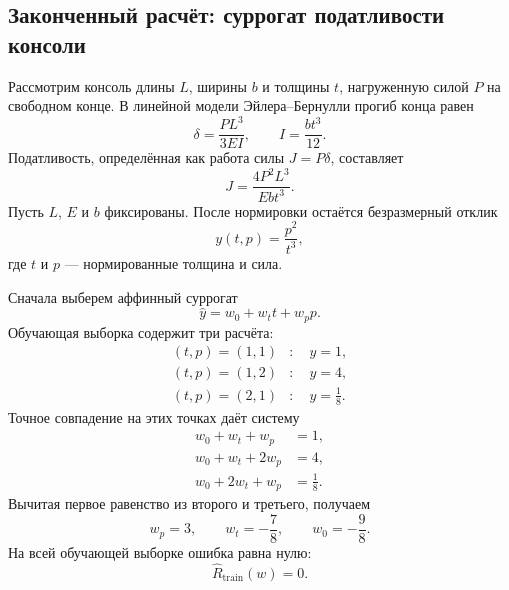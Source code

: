 \subsection{Законченный расчёт: суррогат податливости консоли}
\label{subsec:worked-compliance-surrogate}
Рассмотрим консоль длины $L$, ширины $b$ и толщины $t$, нагруженную силой $P$ на свободном конце. В линейной модели Эйлера--Бернулли прогиб конца равен
\begin{equation}
 \delta
 =
 \frac{PL^3}{3EI},
 \qquad
 I=\frac{bt^3}{12}.
\end{equation}
Податливость, определённая как работа силы $J=P\delta$, составляет
\begin{equation}
\label{eq:cantilever-compliance}
 J
 =
 \frac{4P^2L^3}{Ebt^3}.
\end{equation}
Пусть $L$, $E$ и $b$ фиксированы. После нормировки остаётся безразмерный отклик
\begin{equation}
 y(t,p)
 =
 \frac{p^2}{t^3},
\end{equation}
где $t$ и $p$ --- нормированные толщина и сила.

Сначала выберем аффинный суррогат
\begin{equation}
\label{eq:affine-compliance-surrogate}
 \widehat y
 =
 w_0+w_t t+w_p p.
\end{equation}
Обучающая выборка содержит три расчёта:
\begin{align}
 (t,p)=(1,1)&:\quad y=1,
 \label{eq:worked-train-point-one}\\
 (t,p)=(1,2)&:\quad y=4,
 \label{eq:worked-train-point-two}\\
 (t,p)=(2,1)&:\quad y=\frac18.
\end{align}
Точное совпадение на этих точках даёт систему
\begin{align}
 w_0+w_t+w_p&=1,
 \label{eq:worked-affine-system-one}\\
 w_0+w_t+2w_p&=4,
 \label{eq:worked-affine-system-two}\\
 w_0+2w_t+w_p&=\frac18.
\end{align}
Вычитая первое равенство из второго и третьего, получаем
\begin{equation}
 w_p=3,
 \qquad
 w_t=-\frac78,
 \qquad
 w_0=-\frac98.
\end{equation}
На всей обучающей выборке ошибка равна нулю:
\begin{equation}
\label{eq:worked-zero-training-risk}
 \widehat R_{\mathrm{train}}(w)=0.
\end{equation}

